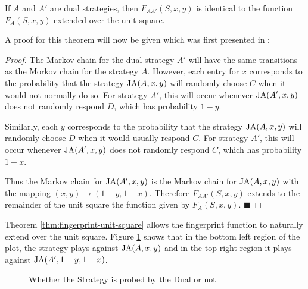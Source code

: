 \begin{theorem}\label{thm:fingerprint-unit-square}
If $A$ and $A'$ are dual strategies, then $F_{AA'}(S, x, y)$ is identical to the function $F_A(S, x, y)$ extended over the unit square.
\end{theorem}

A proof for this theorem will now be given which was first presented in \cite{Ashlock2004}:
\begin{proof}\label{prf:fingerprint-unit-square}
The Markov chain for the dual strategy $A'$ will have the same transitions as the Morkov chain for the strategy $A$.
However, each entry for $x$ corresponds to the probability that the strategy $\text{JA}(A, x, y)$ will randomly choose $C$ when it would not normally do so.
For strategy $A'$, this will occur whenever $\text{JA}(A', x, y)$ does not randomly respond $D$, which has probability $1 - y$.

Similarly, each $y$ corresponds to the probability that the strategy $\text{JA}(A, x, y)$ will randomly choose $D$ when it would usually respond $C$.
For strategy $A'$, this will occur whenever $\text{JA}(A', x, y)$ does not randomly respond $C$, which has probability $1 - x$.

Thus the Markov chain for $\text{JA}(A', x, y)$ is the Markov chain for $\text{JA}(A, x, y)$ with the mapping $(x, y) \rightarrow (1-y, 1-x)$.
Therefore $F_{AA'}(S, x, y)$ extends to the remainder of the unit square the function given by $F_A(S, x, y)$. $\blacksquare$
\end{proof}

Theorem \ref{thm:fingerprint-unit-square} allows the fingerprint function to naturally extend over the unit square.
Figure \ref{fig:DualProbe} shows that in the \textcolor{sol-violet}{bottom left} region of the plot, the strategy plays against $\text{JA}(A, x, y)$ and in the \textcolor{sol-cyan}{top right} region it plays against $\text{JA}(A', 1-y, 1-x)$.

\begin{figure}[!hbtp]
    \begin{center}
        
        \caption{Whether the Strategy is probed by the Dual or not}\label{fig:DualProbe}
    \end{center}
\end{figure}




\solarizedPalette


